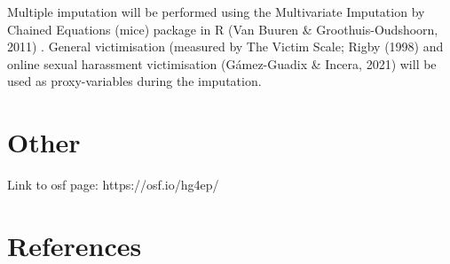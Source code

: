 \documentclass[
]{article}
\begin{document}
Multiple imputation will be performed using the Multivariate Imputation
by Chained Equations (mice) package in R (Van Buuren \&
Groothuis-Oudshoorn, 2011) . General victimisation (measured by The
Victim Scale; Rigby (1998) and online sexual harassment victimisation
(Gámez-Guadix \& Incera, 2021) will be used as proxy-variables during
the imputation.

\section{Other}\label{other}

Link to osf page: https://osf.io/hg4ep/

\section*{References}\label{references}
\end{document}
